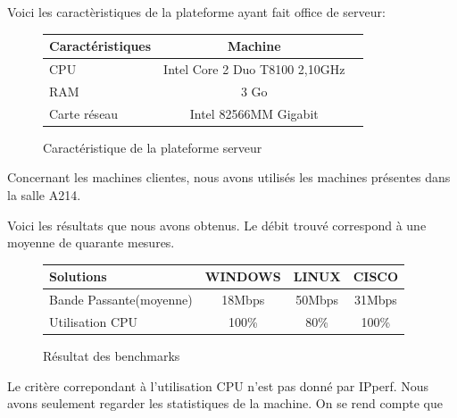 Voici les caractèristiques de la plateforme ayant fait office de serveur:

\begin{figure}[H]
	\begin{center}
\begin{tabular}{|l|c|c|}
\hline
Caractéristiques & Machine \\
\hline
CPU & Intel Core 2 Duo T8100 2,10GHz \\
RAM & 3 Go \\
Carte réseau & Intel 82566MM Gigabit \\
\hline
\end{tabular}
	\end{center}
	\caption{Caractéristique de la plateforme serveur}
	\label{Caractéristique_de_la_plateforme_serveur}
\end{figure}

Concernant les machines clientes, nous avons utilisés les machines présentes dans la salle A214.

Voici les résultats que nous avons obtenus. Le débit trouvé correspond à une moyenne de quarante mesures.

\begin{figure}[H]
	\begin{center}
\begin{tabular}{|l|c|c|c|}
\hline
Solutions & WINDOWS & LINUX & CISCO \\
\hline
Bande Passante(moyenne) & 18Mbps & 50Mbps & 31Mbps \\
Utilisation CPU & 100\% & 80\% & 100\% \\
\hline
\end{tabular}
	\end{center}
	\caption{Résultat des benchmarks}
	\label{Résultat_des_benchmarks}
\end{figure}

Le critère correpondant à l'utilisation CPU n'est pas donné par IPperf. Nous avons seulement regarder les statistiques de la machine. On se rend compte que